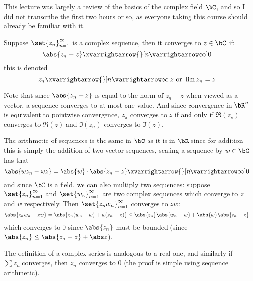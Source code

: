 \documentclass[10pt]{article}
\begin{document}


\bigskip

This lecture was largely a review of the basics of the complex field $\bC$, and so I did not transcribe the first two hours or so, as everyone taking this course should already be familiar with it.

\begin{defn*}

    Suppose $\set{z_n}_{n=1}^\infty$ is a complex sequence, then it converges to $z\in\bC$ if:
    \[ \abs{z_n-z}\xvarrightarrow{}[n\varrightarrow\infty]0 \]
    this is denoted
    \[ z_n\xvarrightarrow{}[n\varrightarrow\infty] z \text{ or } \lim z_n = z \]

\end{defn*}

Note that since $\abs{z_n-z}$ is equal to the norm of $z_n-z$ when viewed as a vector, a sequence converges to at most one value.
And since convergence in $\bR^n$ is equivalent to pointwise convergence, $z_n$ converges to $z$ if and only if $\Re(z_n)$ converges to $\Re(z)$ and $\Im(z_n)$ converges to $\Im(z)$.

The arithmetic of sequences is the same in $\bC$ as it is in $\bR$ since for addition this is simply the addition of two vector sequences, scaling a sequence by $w\in\bC$ has that
\[ \abs{wz_n-wz} = \abs{w}\cdot\abs{z_n-z} \xvarrightarrow{}[n\varrightarrow\infty] 0 \]
and since $\bC$ is a field, we can also multiply two sequences: suppose $\set{z_n}_{n=1}^\infty$ and $\set{w_n}_{n=1}^\infty$ are two complex sequences which converge to $z$ and $w$ respectively.
Then $\set{z_nw_n}_{n=1}^\infty$ converges to $zw$:
\[ \abs{z_nw_n-zw} = \abs{z_n(w_n-w)+w(z_n-z)} \leq \abs{z_n}\abs{w_n-w} + \abs{w}\abs{z_n-z} \]
which converges to $0$ since $\abs{z_n}$ must be bounded (since $\abs{z_n}\leq\abs{z_n-z}+\abs z$).

The definition of a complex series is analogous to a real one, and similarly if $\sum z_n$ converges, then $z_n$ converges to $0$ (the proof is simple using sequence arithmetic).
\end{document}
